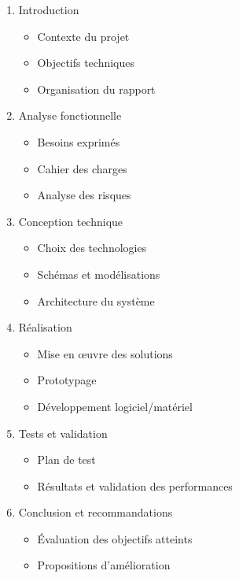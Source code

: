 \begin{enumerate}
    \item Introduction
          \begin{itemize}
              \item Contexte du projet
              \item Objectifs techniques
              \item Organisation du rapport
          \end{itemize}
    \item Analyse fonctionnelle
          \begin{itemize}
              \item Besoins exprimés
              \item Cahier des charges
              \item Analyse des risques
          \end{itemize}
    \item Conception technique
          \begin{itemize}
              \item Choix des technologies
              \item Schémas et modélisations
              \item Architecture du système
          \end{itemize}
    \item Réalisation
          \begin{itemize}
              \item Mise en œuvre des solutions
              \item Prototypage
              \item Développement logiciel/matériel
          \end{itemize}
    \item Tests et validation
          \begin{itemize}
              \item Plan de test
              \item Résultats et validation des performances
          \end{itemize}
    \item Conclusion et recommandations
          \begin{itemize}
              \item Évaluation des objectifs atteints
              \item Propositions d'amélioration
          \end{itemize}

\end{enumerate}